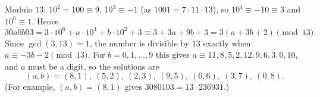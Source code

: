 Modulo $13$: $10^2=100\equiv9$, $10^3\equiv-1$ (as $1001=7\cdot11\cdot13$), so $10^4\equiv-10\equiv3$ and $10^6\equiv1$. Hence
\[\overline{30a0b03}=3\cdot10^6+a\cdot10^4+b\cdot10^2+3\equiv3+3a+9b+3=3(a+3b+2)\pmod{13}.\]
Since $\gcd(3,13)=1$, the number is divisible by $13$ exactly when $a\equiv-3b-2\pmod{13}$. For $b=0,1,\dots,9$ this gives $a\equiv11,8,5,2,12,9,6,3,0,10$, and $a$ must be a digit, so the solutions are
\[\boxed{(a,b)=(8,1),\ (5,2),\ (2,3),\ (9,5),\ (6,6),\ (3,7),\ (0,8)}.\]
(For example, $(a,b)=(8,1)$ gives $3080103=13\cdot236931$.)
